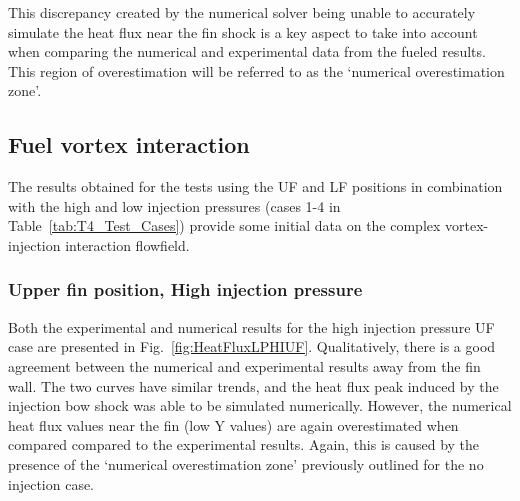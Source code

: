 \documentclass{AIAA}
\begin{document}
This discrepancy created by the numerical solver being unable to accurately simulate the heat flux near the fin shock is a key aspect to take into account when comparing the numerical and experimental data from the fueled results. 
This region of overestimation will be referred to as the `numerical overestimation zone'.


\subsection{Fuel vortex interaction}

The results obtained for the tests using the UF and LF positions in combination with the high and low injection pressures (cases 1-4 in Table~\ref{tab:T4_Test_Cases}) provide some initial data on the complex vortex-injection interaction flowfield.


\subsubsection{Upper fin position, High injection pressure}

Both the experimental and numerical results for the high injection pressure UF case are presented in Fig.~\ref{fig:HeatFluxLPHIUF}.
Qualitatively, there is a good agreement between the numerical and experimental results away from the fin wall.
The two curves have similar trends, and the heat flux peak induced by the injection bow shock was able to be simulated numerically.
However, the numerical heat flux values near the fin (low Y values) are again overestimated when compared compared to the experimental results.
Again, this is caused by the presence of the `numerical overestimation zone' previously outlined for the no injection case.
\end{document}
